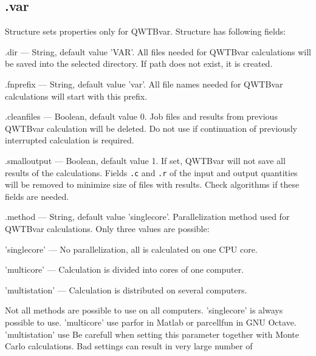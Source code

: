 \documentclass[12pt,a4paper,oneside]{report} %
\newcommand{\li}[1]{\lstinline{#1}}     %
\begin{document}
\subsection{\textsf{.var}} %
\label{structcalcsetvar}
Structure sets properties only for QWTBvar. Structure has following fields:
\begin{tightdesc}
        \item [\textsf{.dir}] ---  String, default value 'VAR'. All files
        needed for QWTBvar calculations will be saved into the selected
        directory. If path does not exist, it is created.
        \item [\textsf{.fnprefix}] ---  String, default value 'var'. All file
        names needed for QWTBvar calculations will start with this prefix.
        \item [\textsf{.cleanfiles}] ---  Boolean, default value 0. Job files
            and results from previous QWTBvar calculation will be deleted. Do
            not use if continuation of previously interrupted calculation is
            required.
        \item [\textsf{.smalloutput}] ---  Boolean, default value 1. If set,
            QWTBvar will not save all results of the calculations. Fields
            \li{.c} and \li{.r} of the input and output quantities will be
            removed to minimize size of files with results. Check algorithms if
            these fields are needed.
        \item [\textsf{.method}] ---  String, default value 'singlecore'. Parallelization method used for 
        QWTBvar calculations. Only three values are possible:
        \begin{tightdesc}
                \item [\textsf{'singlecore'}] ---  No parallelization, all is calculated on one CPU core.
                \item [\textsf{'multicore'}] ---  Calculation is divided into cores of one computer.
                \item [\textsf{'multistation'}] ---  Calculation is distributed on several computers.
        \end{tightdesc}
        Not all methods are possible to use on all computers. 'singlecore' is always possible to
        use. 'multicore' use parfor in Matlab or parcellfun in GNU Octave. 'multistation' use %
        Be carefull when setting this parameter together with Monte Carlo
        calculations. Bad settings can result in very large number of

\end{tightdesc}
\end{document}
